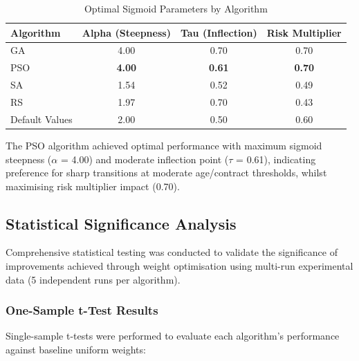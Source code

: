 \begin{table}[H]
\centering
\caption{Optimal Sigmoid Parameters by Algorithm}
\label{tab:sigmoid_parameters}
\begin{tabular}{lccc}
\toprule
\textbf{Algorithm} & \textbf{Alpha (Steepness)} & \textbf{Tau (Inflection)} & \textbf{Risk Multiplier} \\
\midrule
GA & 4.00 & 0.70 & 0.70 \\
PSO & \textbf{4.00} & \textbf{0.61} & \textbf{0.70} \\
SA & 1.54 & 0.52 & 0.49 \\
RS & 1.97 & 0.70 & 0.43 \\
\midrule
Default Values & 2.00 & 0.50 & 0.60 \\
\bottomrule
\end{tabular}
\end{table}

The PSO algorithm achieved optimal performance with maximum sigmoid steepness ($\alpha$ = 4.00) and moderate inflection point ($\tau$ = 0.61), indicating preference for sharp transitions at moderate age/contract thresholds, whilst maximising risk multiplier impact (0.70).

\subsection{Statistical Significance Analysis}

Comprehensive statistical testing was conducted to validate the significance of improvements achieved through weight optimisation using multi-run experimental data (5 independent runs per algorithm).

\subsubsection{One-Sample t-Test Results}

Single-sample t-tests were performed to evaluate each algorithm's performance against baseline uniform weights:

